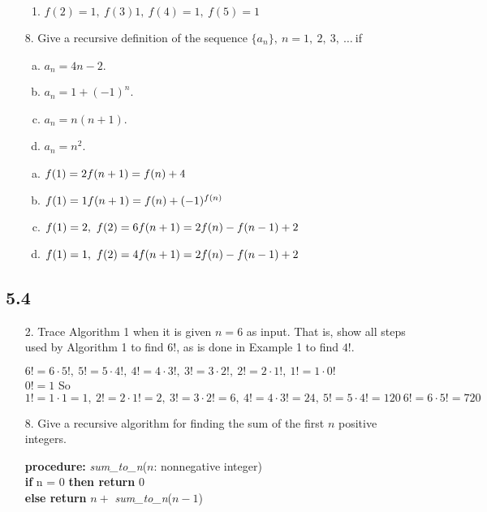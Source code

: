 \begin{itemize}
\begin{enumerate}
              \item $f(2)=1, \ f(3) 1, \ f(4) = 1, \ f(5) = 1$
          \end{enumerate}
    \item[8.]  Give a recursive definition of the sequence $\{a_n \},\ n = 1,\ 2,\ 3,\ \ldots\ $if
          \begin{enumerate}[a.]
              \item$a_n = 4n - 2.$
              \item$a_n = 1 + (-1)^n $.
              \item$a_n = n(n + 1)$.
              \item$a_n = n^2 $.
          \end{enumerate}
          \answer
          \begin{enumerate}[a.]
              \item $f(1) =2 \\ f(n+1) = f(n) +4$
              \item $f(1)=1\\f(n+1) = f(n) + (-1)^{f(n)}$
              \item $f(1) =2,\ f(2) = 6 \\ f(n+1) = 2f(n) -f(n-1) +2$
              \item $f(1) =1,\ f(2) = 4 \\ f(n+1) = 2f(n) -f(n-1) +2$
          \end{enumerate}


\end{itemize}

\subsection{5.4}
\begin{itemize}
    \item[2.] Trace Algorithm 1 when it is given $n = 6$ as input. That
is, show all steps used by Algorithm 1 to find $6!$, as is
done in Example 1 to find $4!$. 

\answer 

$6! = 6 \cdot 5!, \ 5! = 5 \cdot 4!, \ 4! = 4 \cdot 3!, \ 3! = 3 \cdot 2!, \ 2! = 2 \cdot 1!, \ 1! = 1 \cdot 0!$\\
$0! = 1$ So $1! = 1 \cdot 1 = 1, \ 2! = 2 \cdot 1! = 2, \ 3! = 3 \cdot 2! = 6, \ 4! = 4 \cdot 3! = 24, \ 5! = 5 \cdot 4! = 120 \ 6! = 6 \cdot 5! = 720$

\item[8.]  Give a recursive algorithm for finding the sum of the
first $n$ positive integers.

\answer

\textbf{procedure:} \textit{sum\_to\_n}($n$: nonnegative integer)\\
\textbf{if} n = 0 \textbf{then return} 0\\
\textbf{else return} $n+$ \textit{sum\_to\_n}($n-1$)



\end{itemize}